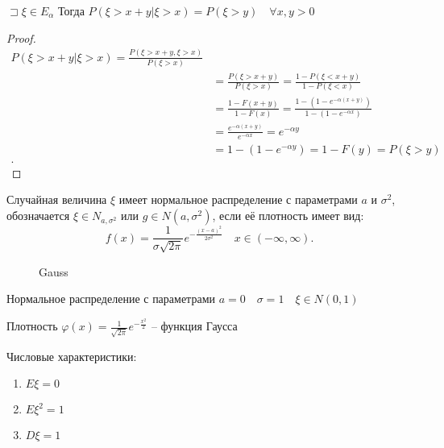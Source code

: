 \begin{theorem}

    $\sqsupset \xi\in E_\alpha$ Тогда $P\left( \xi > x + y| \xi > x \right) = P\left( \xi > y \right) \quad \forall x,y >0 $
\end{theorem}
\begin{proof}
     \begin{align*}
         P\left( \xi > x+y | \xi > x \right)  = \frac{P\left( \xi > x + y, \xi > x \right) }{P\left( \xi > x \right) }\\
         &= \frac{P\left( \xi > x+y \right) }{P\left( \xi > x \right) } = \frac{1 - P\left( \xi < x +y \right) }{1 - P\left( \xi < x \right) } \\
         &= \frac{1 - F(x+y)}{1  - F(x)}  = \frac{1 - \left( 1 - e^{-\alpha(x+y)} \right) }{1 - \left( 1 - e^{-\alpha x} \right) }\\
         &= \frac{e^{-\alpha(x+y)}}{e^{-\alpha x}} = e^{-\alpha y} \\
         &= 1 - \left( 1 - e^{-\alpha y} \right)  = 1 - F(y) = P\left( \xi > y \right)  \\
    .\end{align*}
\end{proof}

\begin{definition}
    Случайная величина $\xi$ имеет нормальное распределение с параметрами  $a$ и  $\sigma^2$, обозначается  $\xi\in N_{a, \sigma^2}$ или $g\in N(a, \sigma^2)$, если её плотность имеет вид:
     \[
         f(x) = \frac{1}{\sigma \sqrt{2\pi } }e^{- \frac{\left( x-a \right) ^2}{2\sigma^2}}\quad x\in \left( -\infty , \infty  \right)
    .\]

\begin{figure}[!ht]
    \centering
    \caption{Gauss}
    \label{fig:gauss}
\end{figure}
\end{definition}

\begin{definition}

    Нормальное распределение с параметрами $a = 0\quad \sigma =  1\quad \xi\in N(0,1)$

    Плотность  $\varphi(x) = \frac{1}{\sqrt{2\pi } }e^{-\frac{x^2}{2}}$ -- функция Гаусса
\end{definition}

Числовые характеристики:
\begin{enumerate}
    \item $E\xi = 0$
    \item $E\xi^2 = 1$
    \item $D\xi = 1$
\end{enumerate}

